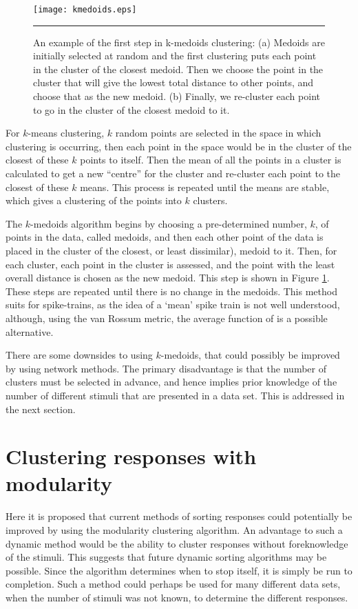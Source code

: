 \begin{figure}[htb]
  \centering
  \texttt{[image: kmedoids.eps]}
  \bigskip
  \rule{31.5em}{0.5pt}
  \caption{An example of the first step in k-medoids clustering:  (a) Medoids 
    are initially selected at random and the first clustering puts each point 
    in the cluster of the closest medoid. Then we choose the point in the 
    cluster that will give the lowest total distance to other points, and 
    choose that as the new medoid. (b) Finally, we re-cluster each point to go 
    in the cluster of the closest medoid to it.  \label{kmed}}
\end{figure}


For $k$-means clustering, $k$ random points are selected in the space in which 
clustering is occurring, then each point in the space would be in the cluster of 
the closest of these $k$ points to itself.  Then the mean of all 
the points in a cluster is calculated to get a new ``centre'' for the cluster and re-cluster 
each point to the closest of these $k$ means.  This process is repeated until 
the means are stable, which gives a clustering of the points into $k$ clusters.

The $k$-medoids algorithm begins by choosing a pre-determined number, $k$, of points in the data, called medoids, 
and then  each other point of the data is placed in the cluster of the 
closest, or least dissimilar), medoid to it.  Then, for each cluster, 
 each point in the cluster is assessed, and the point with 
the least overall distance is chosen as the new medoid. This step is shown in Figure 
\ref{kmed}. These steps are repeated until there is no change in the 
medoids.  This method suits for spike-trains, as the idea of a `mean'
spike train is not well understood, although, using the van Rossum metric, the average function of \citet{JulienneHoughton2012a} is a possible alternative.

There are some downsides to using $k$-medoids, that could possibly be 
improved by using network methods.  The primary disadvantage is that the number of 
 clusters must be selected in advance, and hence implies prior knowledge of the number of different 
stimuli that are presented in a data set. This is addressed in the next section.

\section{Clustering responses with modularity}

Here it is proposed that current methods of sorting 
responses could potentially be improved by using the modularity clustering algorithm.  An advantage to such 
a dynamic method would be the ability to cluster responses without foreknowledge of the stimuli.  This suggests that future dynamic sorting algorithms may be possible. Since the algorithm determines when to stop itself, it is simply be run to completion.  Such a method could perhaps be used for 
many different data sets, when the number of stimuli was not known, to 
determine the different responses.

